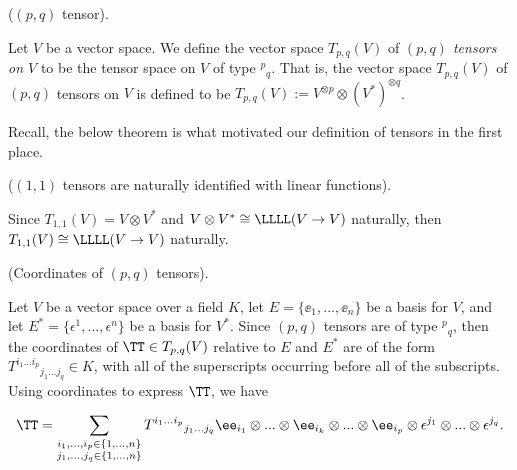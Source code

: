 \begin{defn}
    \label{ch::motivated_intro::defn::pq_tensor}
    
    ($(p, q)$ tensor).
    
    Let $V$ be a vector space. We define the vector space $T_{p,q}(V)$ of \textit{$(p, q)$ tensors on $V$} to be the tensor space on $V$ of type $^p{}_q$. That is, the vector space $T_{p,q}(V)$ of $(p, q)$ tensors on $V$ is defined to be $T_{p,q}(V) := V^{\otimes p} \otimes (V^*)^{\otimes q}$.
\end{defn}

Recall, the below theorem is what motivated our definition of tensors in the first place.

\begin{theorem}
    ($(1, 1)$ tensors are naturally identified with linear functions).
    
    Since $T_{1,1}(V) = V \otimes V^*$ and $V \otimes V^* \cong \LLLL(V \rightarrow V)$ naturally, then $T_{1,1}(V) \cong \LLLL(V \rightarrow V)$ naturally. 
\end{theorem}

\begin{theorem}
    (Coordinates of $(p, q)$ tensors).

    Let $V$ be a vector space over a field $K$, let $E = \{\ee_1, ..., \ee_n\}$ be a basis for $V$, and let $E^* = \{\epsilon^1, ..., \epsilon^n\}$ be a basis for $V^*$. Since $(p, q)$ tensors are of type $^p{}_q$, then the coordinates of $\TT \in T_{p,q}(V)$ relative to $E$ and $E^*$ are of the form $T^{i_1 ... i_p}{}_{j_1 ... j_q} \in K$, with all of the superscripts occurring before all of the subscripts. Using coordinates to express $\TT$, we have

     \begin{align*}
        \TT = \sum_{\substack{i_1, ..., i_p \in \{1, ..., n\} \\ j_1, ..., j_q \in \{1, ..., n\}}} T^{i_1 ... i_p}{}_{j_1 ... j_q} \ee_{i_1} \otimes ... \otimes \ee_{i_k} \otimes ... \otimes \ee_{i_p} \otimes \epsilon^{j_1} \otimes ... \otimes \epsilon^{j_q}.
    \end{align*}
\end{theorem}

